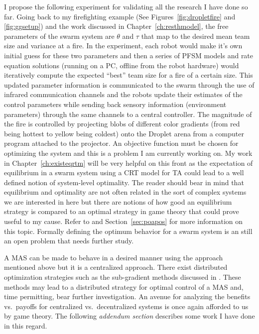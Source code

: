 \documentclass[defaultstyle,12pt]{proposal}
\begin{document}
I propose the following experiment for validating all the research I have done so far. Going back to my firefighting example (See Figures~\ref{fig:dropletfire} and \ref{fig:ggsetup}) and the work discussed in Chapter~\ref{ch:resthmodel}, the free parameters of the swarm system are $\theta$ and $\tau$ that map to the desired mean team size and variance at a fire. In the experiment, each robot would make it's own initial guess for these two parameters and then a series of PFSM models and rate equation solutions (running on a PC, offline from the robot hardware) would iteratively compute the expected ``best'' team size for a fire of a certain size. This updated parameter information is communicated to the swarm through the use of infrared communication channels and the robots update their estimates of the control parameters while sending back sensory information (environment parameters) through the same channels to a central controller. The magnitude of the fire is controlled by projecting blobs of different color gradients (from red being hottest to yellow being coldest) onto the Droplet arena from a computer program attached to the projector. An objective function must be chosen for optimizing the system and this is a problem I am currently working on. My work in Chapter~\ref{ch:existeqrtm} will be very helpful on this front as the expectation of equilibrium in a swarm system using a CRT model for TA could lead to a well defined notion of system-level optimality. The reader should bear in mind that equilibrium and optimality are not often related in the sort of complex systems we are interested in here but there are notions of how good an equilibrium strategy is compared to an optimal strategy in game theory that could prove useful to my cause. Refer to \cite{Koutsoupias1999} and Section~\ref{sec:poapos} for more information on this topic. Formally defining the optimum behavior for a swarm system is an still an open problem that needs further study. 

A MAS can be made to behave in a desired manner using the approach mentioned above but it is a centralized approach. There exist distributed optimization strategies such as the sub-gradient methods discussed in \cite{Nedic2009}. These methods may lead to a distributed strategy for optimal control of a MAS and, time permitting, bear further investigation. An avenue for analyzing the benefits vs.~payoffs for centralized vs.~decentralized systems is once again afforded to us by game theory. The following \emph{addendum section} describes some work I have done in this regard.
\end{document}
